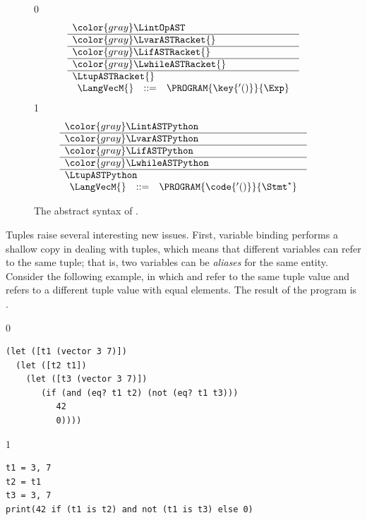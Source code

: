 \documentclass[7x10]{TimesAPriori_MIT}%
\newcommand{\gray}[1]{{\color{gray} #1}}
\def\racketEd{0}
\def\pythonEd{1}
\providecommand{\BookEdition}{1}
\let\edition\BookEdition
\newcommand{\pythonColor}[0]{}
\numberwithin{theorem}{chapter}
\numberwithin{definition}{chapter}
\numberwithin{equation}{chapter}
\begin{document}
\begin{figure}[tp]
\centering
\begin{tcolorbox}[colback=white]
    \small
{\if\edition\racketEd    
\[
\begin{array}{l}
  \gray{\LintOpAST} \\ \hline
  \gray{\LvarASTRacket{}} \\ \hline
  \gray{\LifASTRacket{}} \\ \hline
  \gray{\LwhileASTRacket{}} \\ \hline
  \LtupASTRacket{} \\
\begin{array}{lcl}
  \LangVecM{} &::=& \PROGRAM{\key{'()}}{\Exp}
\end{array}
\end{array}
\]
\fi}
{\if\edition\pythonEd\pythonColor
\[
\begin{array}{l}
  \gray{\LintASTPython} \\ \hline
  \gray{\LvarASTPython} \\ \hline
  \gray{\LifASTPython} \\ \hline
  \gray{\LwhileASTPython} \\ \hline
  \LtupASTPython \\
  \begin{array}{lcl}
    \LangVecM{} &::=& \PROGRAM{\code{'()}}{\Stmt^{*}}
  \end{array}
\end{array}
\]
\fi}
\end{tcolorbox}

\caption{The abstract syntax of \LangVec{}.}
\label{fig:Lvec-syntax}
\end{figure}

Tuples raise several interesting new issues.  First, variable binding
performs a shallow copy in dealing with tuples, which means that
different variables can refer to the same tuple; that is, two
variables can be \emph{aliases} for the same
entity. Consider the following example, in which  and
 refer to the same tuple value and  refers to a
different tuple value with equal elements. The result of the
program is .


\begin{center}
\begin{minipage}{0.96\textwidth}
{\if\edition\racketEd        
\begin{lstlisting}
(let ([t1 (vector 3 7)])
  (let ([t2 t1])
    (let ([t3 (vector 3 7)])
       (if (and (eq? t1 t2) (not (eq? t1 t3)))
          42
          0))))
\end{lstlisting}
\fi}
{\if\edition\pythonEd\pythonColor
\begin{lstlisting}
t1 = 3, 7
t2 = t1
t3 = 3, 7
print(42 if (t1 is t2) and not (t1 is t3) else 0)
\end{lstlisting}
\fi}
\end{minipage}
\end{center}
\end{document}
